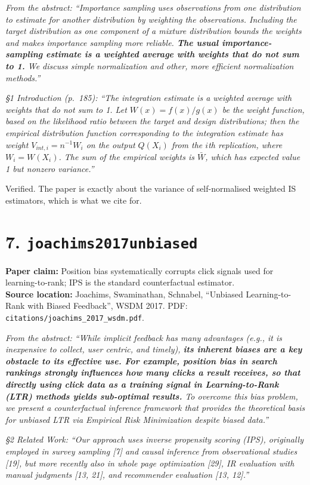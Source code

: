 \documentclass[11pt]{article}
\newcommand{\paperclaim}[1]{\textbf{Paper claim:} #1}
\newcommand{\source}[1]{\textbf{Source location:} #1}
\newcommand{\quoted}[1]{\begin{tcolorbox}\textit{#1}\end{tcolorbox}}
\begin{document}
\quoted{From the abstract: ``Importance sampling uses observations from
one distribution to estimate for another distribution by weighting the
observations. Including the target distribution as one component of a
mixture distribution bounds the weights and makes importance sampling
more reliable. \textbf{The usual importance-sampling estimate is a
weighted average with weights that do not sum to 1.} We discuss simple
normalization and other, more efficient normalization methods.''}

\quoted{\S1 Introduction (p.~185): ``The integration estimate is a
\emph{weighted average with weights that do not sum to 1.} Let
$W(x) = f(x)/g(x)$ be the weight function, based on the likelihood ratio
between the target and design distributions; then the empirical
distribution function corresponding to the integration estimate has
weight $V_{int,i} = n^{-1}W_i$ on the output $Q(X_i)$ from the $i$th
replication, where $W_i = W(X_i)$. The sum of the empirical weights is
$\bar W$, which has expected value 1 but nonzero variance.''}

\noindent Verified. The paper is exactly about the variance of
self-normalised weighted IS estimators, which is what we cite for.

\bigskip

\section*{7. \texttt{joachims2017unbiased}}
\paperclaim{Position bias systematically corrupts click signals used for
learning-to-rank; IPS is the standard counterfactual estimator.}\\
\source{Joachims, Swaminathan, Schnabel, ``Unbiased Learning-to-Rank with
Biased Feedback'', WSDM 2017. PDF:
\texttt{citations/joachims\_2017\_wsdm.pdf}.}

\quoted{From the abstract: ``While implicit feedback has many advantages
(e.g., it is inexpensive to collect, user centric, and timely), \textbf{its
inherent biases are a key obstacle to its effective use. For example,
position bias in search rankings strongly influences how many clicks a
result receives, so that directly using click data as a training signal in
Learning-to-Rank (LTR) methods yields sub-optimal results.} To overcome
this bias problem, we present a counterfactual inference framework that
provides the theoretical basis for unbiased LTR via Empirical Risk
Minimization despite biased data.''}

\quoted{\S2 Related Work: ``Our approach uses inverse propensity scoring
(IPS), originally employed in survey sampling [7] and causal inference
from observational studies [19], but more recently also in whole page
optimization [29], IR evaluation with manual judgments [13, 21], and
recommender evaluation [13, 12].''}
\end{document}
